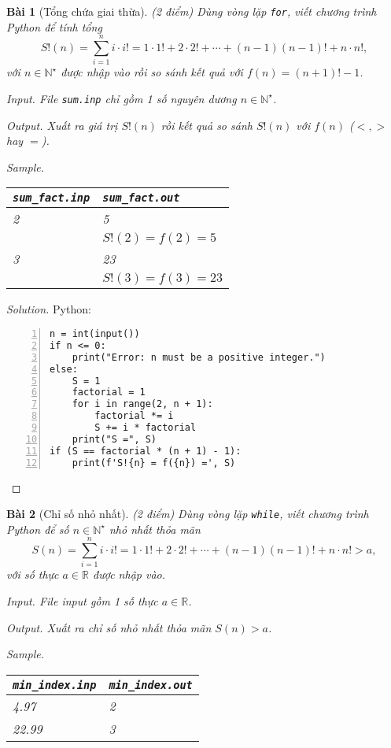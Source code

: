 \documentclass{article}
\newtheorem{baitoan}{Bài}
\begin{document}
\begin{baitoan}[Tổng chứa giai thừa]
	{\rm(2 điểm)} Dùng vòng lặp {\tt for}, viết chương trình Python để tính tổng
	\begin{equation*}
		S!(n) = \sum_{i=1}^n i\cdot i! = 1\cdot1! + 2\cdot2! + \cdots + (n - 1)(n - 1)! + n\cdot n!,
	\end{equation*}
	với $n\in\mathbb{N}^\star$ được nhập vào rồi so sánh kết quả với $f(n) = (n + 1)! - 1$.
	\item {\sf Input.} File {\tt sum.inp} chỉ gồm 1 số nguyên dương $n\in\mathbb{N}^\star$.
	\item {\sf Output.} Xuất ra giá trị $S!(n)$ rồi kết quả so sánh $S!(n)$ với $f(n)$ ($<,>$ hay $=$).
	\item {\sf Sample.}
	\begin{table}[H]
		\centering
		\begin{tabular}{|l|l|}
			\hline
			\verb|sum_fact.inp| & \verb|sum_fact.out| \\
			\hline
			2 & 5 \\
			& $S!(2) = f(2) = 5$ \\
			\hline
			3 & 23 \\
			& $S!(3) = f(3) = 23$ \\
			\hline
		\end{tabular}
	\end{table}
\end{baitoan}

\begin{proof}[Solution]
    Python:
    \begin{Verbatim}[numbers=left,xleftmargin=5mm]
n = int(input())
if n <= 0:
	print("Error: n must be a positive integer.")
else:
	S = 1
	factorial = 1
	for i in range(2, n + 1):
		factorial *= i
		S += i * factorial
	print("S =", S)
if (S == factorial * (n + 1) - 1):
	print(f'S!{n} = f({n}) =', S)
    \end{Verbatim}
\end{proof}

\begin{baitoan}[Chỉ số nhỏ nhất]
	{\rm(2 điểm)} Dùng vòng lặp {\tt while}, viết chương trình Python để số $n\in\mathbb{N}^\star$ nhỏ nhất thỏa mãn
	\begin{equation*}
		S(n) = \sum_{i=1}^n i\cdot i! = 1\cdot1! + 2\cdot2! + \cdots + (n - 1)(n - 1)! + n\cdot n! > a,
	\end{equation*}
	với số thực $a\in\mathbb{R}$ được nhập vào.
	\item {\sf Input.} File input gồm 1 số thực $a\in\mathbb{R}$.
	\item {\sf Output.} Xuất ra chỉ số nhỏ nhất thỏa mãn $S(n) > a$.
	\item {\sf Sample.}
	\begin{table}[H]
		\centering
		\begin{tabular}{|l|l|}
			\hline
			\verb|min_index.inp| & \verb|min_index.out| \\
			\hline
			4.97 & 2 \\
			22.99 & 3 \\
			\hline
		\end{tabular}
	\end{table}
\end{baitoan}
\end{document}
